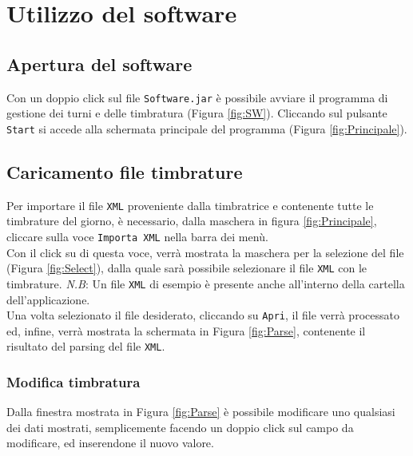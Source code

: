 \chapter{Utilizzo del software}
\section{Apertura del software}
Con un doppio click sul file \verb|Software.jar| è possibile avviare il programma di gestione dei turni e delle timbratura (Figura \ref{fig:SW}).
\noindent
Cliccando sul pulsante \verb|Start| si accede alla schermata principale del programma (Figura \ref{fig:Principale}).
\section{Caricamento file timbrature}
Per importare il file \verb|XML| proveniente dalla timbratrice e contenente tutte le timbrature del giorno, è necessario, dalla maschera in figura \ref{fig:Principale}, cliccare sulla voce \verb|Importa XML| nella barra dei menù.\\

\noindent
Con il click su di questa voce, verrà mostrata la maschera per la selezione del file (Figura \ref{fig:Select}), dalla quale sarà possibile selezionare il file \verb|XML| con le timbrature.
\noindent
\textit{N.B}: Un file \verb|XML| di esempio è presente anche all'interno della cartella dell'applicazione.\\

\noindent
Una volta selezionato il file desiderato, cliccando su \verb|Apri|, il file verrà processato ed, infine, verrà mostrata la schermata in Figura \ref{fig:Parse}, contenente il risultato del parsing del file \verb|XML|.
\subsection{Modifica timbratura}
Dalla finestra mostrata in Figura \ref{fig:Parse} è possibile modificare uno qualsiasi dei dati mostrati, semplicemente facendo un doppio click sul campo da modificare, ed inserendone il nuovo valore.
